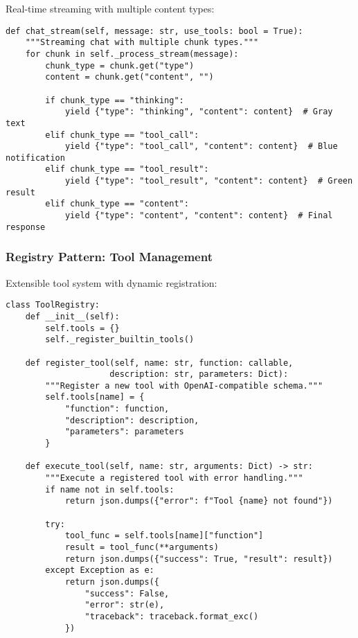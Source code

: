 \documentclass{article}
\begin{document}
Real-time streaming with multiple content types:

\begin{lstlisting}[caption=Streaming Observer Pattern]
def chat_stream(self, message: str, use_tools: bool = True):
    """Streaming chat with multiple chunk types."""
    for chunk in self._process_stream(message):
        chunk_type = chunk.get("type")
        content = chunk.get("content", "")

        if chunk_type == "thinking":
            yield {"type": "thinking", "content": content}  # Gray text
        elif chunk_type == "tool_call":
            yield {"type": "tool_call", "content": content}  # Blue notification
        elif chunk_type == "tool_result":
            yield {"type": "tool_result", "content": content}  # Green result
        elif chunk_type == "content":
            yield {"type": "content", "content": content}  # Final response
\end{lstlisting}

\subsubsection{Registry Pattern: Tool Management}

Extensible tool system with dynamic registration:

\begin{lstlisting}[caption=Tool Registry Pattern]
class ToolRegistry:
    def __init__(self):
        self.tools = {}
        self._register_builtin_tools()

    def register_tool(self, name: str, function: callable,
                     description: str, parameters: Dict):
        """Register a new tool with OpenAI-compatible schema."""
        self.tools[name] = {
            "function": function,
            "description": description,
            "parameters": parameters
        }

    def execute_tool(self, name: str, arguments: Dict) -> str:
        """Execute a registered tool with error handling."""
        if name not in self.tools:
            return json.dumps({"error": f"Tool {name} not found"})

        try:
            tool_func = self.tools[name]["function"]
            result = tool_func(**arguments)
            return json.dumps({"success": True, "result": result})
        except Exception as e:
            return json.dumps({
                "success": False,
                "error": str(e),
                "traceback": traceback.format_exc()
            })
\end{lstlisting}
\end{document}
